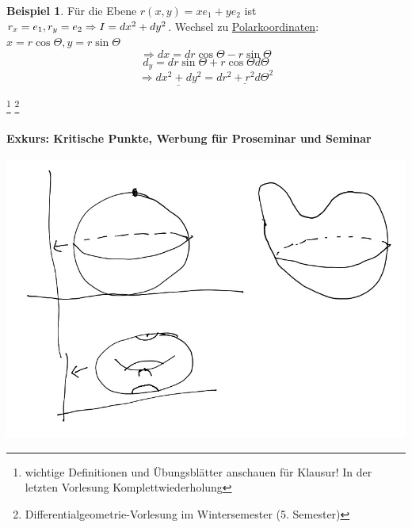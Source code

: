 \documentclass[a4paper,11pt,notitlepage]{report}
\theoremstyle{definition}
\newtheorem{example}{Beispiel}[chapter]
\newcommand{\RM}[1]{\MakeUppercase{\romannumeral #1{}}}
\begin{document}
\begin{example}
	Für die Ebene $r(x,y) = x e_1 + y e_2$ ist $r_x = e_1, r_y = e_2 \Rightarrow \RM{1} = dx^2 + dy^2$.
	\newline
	Wechsel zu \underline{Polarkoordinaten}:
	$x = r \cos \Theta, y = r \sin \Theta$
	 $$\Rightarrow dx = dr \cos \Theta - r \sin \Theta$$
	$$d_y = dr \sin \Theta + r \cos \Theta d \Theta$$
	$$\Rightarrow \underline{dx^2 + dy^2} = \underline{dr^2 + r^2 d \Theta^2}$$
\end{example}


\footnote{wichtige Definitionen und Übungsblätter anschauen für Klausur! In der letzten Vorlesung Komplettwiederholung}
\footnote{Differentialgeometrie-Vorlesung im Wintersemester (5. Semester)}
\paragraph{Exkurs: Kritische Punkte, Werbung für Proseminar und Seminar}
\begin{center}
	\includegraphics[scale=0.4]{images/2012_01_24_Bild1.jpg}
\end{center}
\end{document}
